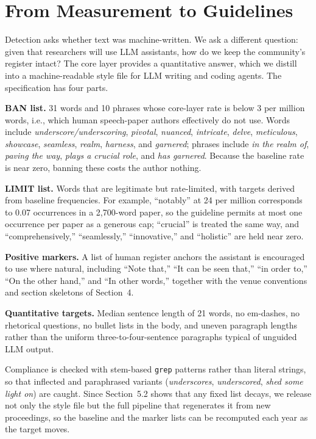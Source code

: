 \documentclass[a4paper,10pt,twocolumn]{article}
\begin{document}
\section{From Measurement to Guidelines}

Detection asks whether text was machine-written. We ask a different question: given that researchers will use LLM assistants, how do we keep the community's register intact? The core layer provides a quantitative answer, which we distill into a machine-readable style file for LLM writing and coding agents. The specification has four parts.

\textbf{BAN list.} 31 words and 10 phrases whose core-layer rate is below 3 per million words, i.e., which human speech-paper authors effectively do not use. Words include \emph{underscore/underscoring}, \emph{pivotal}, \emph{nuanced}, \emph{intricate}, \emph{delve}, \emph{meticulous}, \emph{showcase}, \emph{seamless}, \emph{realm}, \emph{harness}, and \emph{garnered}; phrases include \emph{in the realm of}, \emph{paving the way}, \emph{plays a crucial role}, and \emph{has garnered}. Because the baseline rate is near zero, banning these costs the author nothing.

\textbf{LIMIT list.} Words that are legitimate but rate-limited, with targets derived from baseline frequencies. For example, ``notably'' at 24 per million corresponds to 0.07 occurrences in a 2,700-word paper, so the guideline permits at most one occurrence per paper as a generous cap; ``crucial'' is treated the same way, and ``comprehensively,'' ``seamlessly,'' ``innovative,'' and ``holistic'' are held near zero.

\textbf{Positive markers.} A list of human register anchors the assistant is encouraged to use where natural, including ``Note that,'' ``It can be seen that,'' ``in order to,'' ``On the other hand,'' and ``In other words,'' together with the venue conventions and section skeletons of Section~4.

\textbf{Quantitative targets.} Median sentence length of 21 words, no em-dashes, no rhetorical questions, no bullet lists in the body, and uneven paragraph lengths rather than the uniform three-to-four-sentence paragraphs typical of unguided LLM output.

Compliance is checked with stem-based \texttt{grep} patterns rather than literal strings, so that inflected and paraphrased variants (\emph{underscores}, \emph{underscored}, \emph{shed some light on}) are caught. Since Section~5.2 shows that any fixed list decays, we release not only the style file but the full pipeline that regenerates it from new proceedings, so the baseline and the marker lists can be recomputed each year as the target moves.
\end{document}
